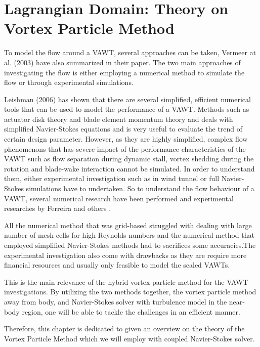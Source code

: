 \chapter{Lagrangian Domain: Theory on Vortex Particle Method}
\label{ch:theory}

To model the flow around a VAWT, several approaches can be taken, Vermeer at al. (2003) \cite{Vermeer2003} have also summarized in their paper. The two main approaches of investigating the flow is either employing a numerical method to simulate the flow or through experimental simulations.

Leishman (2006) \cite{leishman2006principles} has shown that there are several simplified, efficient numerical tools that can be used to model the performance of a VAWT. Methods such as actuator disk theory and blade element momentum theory and deals with simplified Navier-Stokes equations and is very useful to evaluate the trend of certain design parameter. However, as they are highly simplified, complex flow phenomenons that has severe impact of the performance characteristics of the VAWT such as flow separation during dynamic stall, vortex shedding during the rotation and blade-wake interaction cannot be simulated. In order to understand them, either experimental investigation such as in wind tunnel or full Navier-Stokes simulations have to undertaken. So to understand the flow behaviour of a VAWT, several numerical research have been performed \cite{Almohammadi2013} \cite{Ferreira2007} \cite{Islam2008} \cite{Merz2012} and experimental researches by Ferreira \cite{SimaoFerreira2008} \cite{Ferreira} and others \cite{Howell2010} \cite{Mertens2003}.

All the numerical method that was grid-based struggled with dealing with large number of mesh cells for high Reynolds numbers and the numerical method that employed simplified Navier-Stokes methods had to sacrifices some accuracies.The experimental investigation also come with drawbacks as they are require more financial resources and usually only feasible to model the scaled VAWTs.

This is the main relevance of the hybrid vortex particle method for the VAWT investigations. By utilizing the two methods together, the vortex particle method away from body, and Navier-Stokes solver with turbulence model in the near-body region, one will be able to tackle the challenges in an efficient manner.

Therefore, this chapter is dedicated to given an overview on the theory of the Vortex Particle Method which we will employ with coupled Navier-Stokes solver. 

